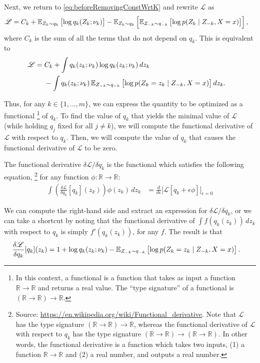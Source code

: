 \documentclass[11pt]{article}
\newcommand{\sL}{\mathscr{L}}
\begin{document}
Next, we return to \eqref{eq:beforeRemovingConstWrtK} and rewrite $\sL$ as
\begin{align}
\sL
&= C_k
    + \expectOver{Z_k \sim q_k}{\log q_k(Z_k; \nu_k)}
    - \expectOver{Z_k \sim q_k}{ \expectOver{Z_{-k} \sim q_{-k}}{ \log p(Z_k \mid Z_{-k}, X = x) } },
\end{align}
where $C_k$ is the sum of all the terms that do not depend on $q_k$.
This is equivalent to
\begin{align}
\sL
&= \begin{aligned}[t]
    & C_k + \int
       q_k(z_k; \nu_k) \log q_k(z_k; \nu_k) \, dz_k \\
    & - \int q_k(z_k; \nu_k) \, \expectOver{Z_{-k} \sim q_{-k}}{ \log p(Z_k = z_k \mid Z_{-k}, X = x) } dz_k.
    \end{aligned}
\end{align}

Thus, for any $k \in \{1, \ldots, m\}$, we can express the quantity to be optimized as a functional%
\footnote{In this context, a functional is a function that takes as input a function $\mathbb R \to \mathbb R$ and returns a real value.  The ``type signature'' of a functional is $(\mathbb R \to \mathbb R) \to \mathbb R$.}
of $q_k$.
To find the value of $q_k$ that yields the minimal value of $\sL$ (while holding $q_j$ fixed for all $j \neq k$), we will compute the functional derivative of $\sL$ with respect to $q_k$.
Then, we will compute the value of $q_k$ that causes the functional derivative of $\sL$ to be zero.

The functional derivative $\delta\sL / \delta q_k$ is the functional which satisfies the following equation,%
    \footnote{Source: \url{https://en.wikipedia.org/wiki/Functional_derivative}.
    Note that $\sL$ has the type signature ${(\mathbb R \to \mathbb R) \to \mathbb R}$, whereas the functional derivative of $\sL$ with respect to $q_k$ has the type signature ${(\mathbb R \to \mathbb R) \to (\mathbb R \to \mathbb R)}$.
    In other words, the functional derivative is a function which takes two inputs, (1) a function ${\mathbb R \to \mathbb R}$ and (2) a real number, and outputs a real number.}
for any function $\phi : \mathbb R \to \mathbb R$:%
\begin{align}
\int \left( \frac{\delta \sL}{\delta q_k}[q_k](z_k) \right) \phi(z_k) \, dz_k
&=
\frac{d}{d\epsilon} \biggl[
    \sL[q_k + \epsilon \phi]
\biggr]_{\epsilon = 0}
\end{align}

We can compute the right-hand side and extract an expression for $\delta\sL / \delta q_k$, or we can take a shortcut by noting that the functional derivative of $\int f(q_k(z_k)) \, dz_k$ with respect to $q_k$ is simply $f'(q_k(z_k))$, for any $f$.
The result is that
\begin{align}
\frac{\delta \sL}{\delta q_k}[q_k](z_k)
&= 1 + \log q_k(z_k; \nu_k)
- \expectOver{Z_{-k} \sim q_{-k}}{ \log p(Z_k = z_k \mid Z_{-k}, X = x) }.
\end{align}
\end{document}
